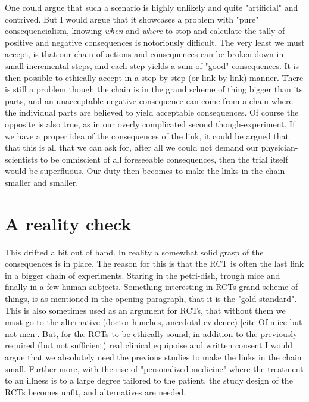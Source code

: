 \documentclass[12p]{article}
\begin{document}
One could argue that such a scenario is highly unlikely and quite "artificial" and contrived. %
But I would argue that it showcases a problem with "pure" consequencialism, knowing \emph{when} and \emph{where} to stop and calculate the tally of positive and negative consequences is notoriously difficult.
The very least we must accept, is that our chain of actions and consequences can be broken down in small incremental steps, and each step yields a sum of "good" consequences.
It is then possible to ethically accept in a step-by-step (or link-by-link)-manner.
There is still a problem though the chain is in the grand scheme of thing bigger than its parts, and an unacceptable  negative consequence can come from a chain where the individual parts are believed to yield acceptable consequences.
Of course the opposite is also true, as in our overly complicated second though-experiment.
If we have a proper idea of the consequences of the link, it could be argued that that this is all that we can ask for, after all we could not demand our physician-scientists to be omniscient of all foreseeable consequences, then the trial itself would be superfluous.
Our duty then becomes to make the links in the chain smaller and smaller.

\section*{A reality check}

This drifted a bit out of hand.
In reality a somewhat solid grasp of the consequences is in place.
The reason for this is that the RCT is often the last link in a bigger chain of experiments. 
Staring in the petri-dish, trough mice and finally in a few human subjects.
Something interesting in RCTs grand scheme of things, is as mentioned in the opening paragraph, that it is the "gold standard".
This is also sometimes used as an argument for RCTs, that without them we must go to the alternative (doctor hunches, anecdotal evidence) [cite Of mice but not men].
But, for the RCTs to be ethically sound, in addition to the previously required (but not sufficient) real clinical equipoise and written consent I would argue that we absolutely need the previous studies to make the links in the chain small.
Further more, with the rise of "personalized medicine" where the treatment to an illness is to a large degree tailored to the patient, the study design of the RCTs becomes unfit, and alternatives are needed.
\end{document}
